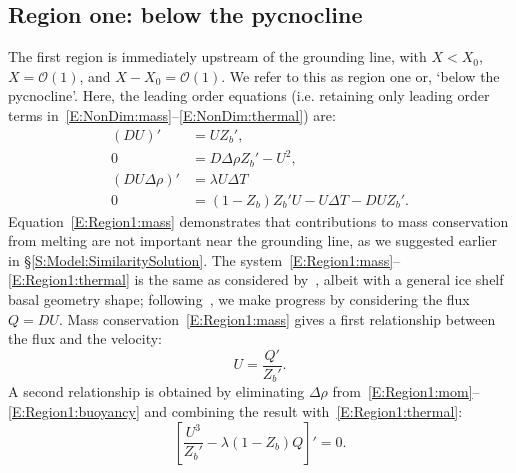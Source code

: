 \documentclass[openacc]{rsproca_new}%
\newcommand{\dd}[2]{\frac{\mathrm{d} #1}{\mathrm{d} #2}}
\newcommand{\order}[1]{\mathcal{O}(#1)}
\begin{document}
\subsection{Region one: below the pycnocline}\label{S:Asymptotics:Region1}
The first region is immediately upstream of the grounding line,  with $X  <  X_0$,  $X= \order{1}$, and $X - X_0 = \mathcal{O}(1)$. We refer to this as region one or, `below the pycnocline'. Here, the leading order equations (i.e. retaining only leading order terms in~\eqref{E:NonDim:mass}--\eqref{E:NonDim:thermal}) are:
\begin{align}
(DU)' &= U Z_b',\label{E:Region1:mass}\\
0 &= D \Delta \rho Z_b' - U^2, \label{E:Region1:mom}\\
(DU\Delta \rho)'  &=\lambda U \Delta T\label{E:Region1:buoyancy}\\
0&= (1  - Z_b)Z_b' U- U\Delta T - DU Z_b'.\label{E:Region1:thermal}
\end{align}
Equation~\eqref{E:Region1:mass} demonstrates that contributions to mass conservation from melting are not important near the grounding line, as we suggested earlier in \S\ref{S:Model:SimilaritySolution}. 
The system~\eqref{E:Region1:mass}--\eqref{E:Region1:thermal} is the same as considered by~\cite{Lazeroms2019JPhysOcean}, albeit with a general ice shelf basal geometry shape; following~\cite{Lazeroms2019JPhysOcean}, we make progress by considering the flux $Q= DU$. Mass conservation~\eqref{E:Region1:mass} gives a first relationship between the flux and the velocity:
\begin{equation}\label{E:Region1:U_Q_relation1}
U = \frac{Q'}{Z_b'}.
\end{equation}
A second relationship is obtained by eliminating $\Delta \rho$ from~\eqref{E:Region1:mom}--\eqref{E:Region1:buoyancy} and combining the result with~\eqref{E:Region1:thermal}:
\begin{equation}\label{E:Region1:U_Q_relation2}
\left[\frac{U^3}{Z_b'} - \lambda (1 - Z_b)Q\right]' = 0.
\end{equation}
\end{document}
